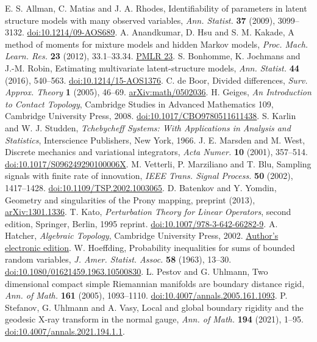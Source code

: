 E. S. Allman, C. Matias and J. A. Rhodes,
Identifiability of parameters in latent structure models with many observed variables,
\emph{Ann. Statist.} \textbf{37} (2009), 3099--3132.
\href{https://doi.org/10.1214/09-AOS689}{doi:10.1214/09-AOS689}.
A. Anandkumar, D. Hsu and S. M. Kakade,
A method of moments for mixture models and hidden Markov models,
\emph{Proc. Mach. Learn. Res.} \textbf{23} (2012), 33.1--33.34.
\href{https://proceedings.mlr.press/v23/anandkumar12.html}{PMLR 23}.
S. Bonhomme, K. Jochmans and J.-M. Robin,
Estimating multivariate latent-structure models,
\emph{Ann. Statist.} \textbf{44} (2016), 540--563.
\href{https://doi.org/10.1214/15-AOS1376}{doi:10.1214/15-AOS1376}.
C. de Boor, Divided differences,
\emph{Surv. Approx. Theory} \textbf{1} (2005), 46--69.
\href{https://arxiv.org/abs/math/0502036}{arXiv:math/0502036}.
H. Geiges, \emph{An Introduction to Contact Topology},
Cambridge Studies in Advanced Mathematics 109, Cambridge University Press, 2008.
\href{https://doi.org/10.1017/CBO9780511611438}{doi:10.1017/CBO9780511611438}.
S. Karlin and W. J. Studden,
\emph{Tchebycheff Systems: With Applications in Analysis and Statistics},
Interscience Publishers, New York, 1966.
J. E. Marsden and M. West,
Discrete mechanics and variational integrators,
\emph{Acta Numer.} \textbf{10} (2001), 357--514.
\href{https://doi.org/10.1017/S096249290100006X}{doi:10.1017/S096249290100006X}.
M. Vetterli, P. Marziliano and T. Blu,
Sampling signals with finite rate of innovation,
\emph{IEEE Trans. Signal Process.} \textbf{50} (2002), 1417--1428.
\href{https://doi.org/10.1109/TSP.2002.1003065}{doi:10.1109/TSP.2002.1003065}.
D. Batenkov and Y. Yomdin,
Geometry and singularities of the Prony mapping,
preprint (2013), \href{https://arxiv.org/abs/1301.1336}{arXiv:1301.1336}.
T. Kato, \emph{Perturbation Theory for Linear Operators},
second edition, Springer, Berlin, 1995 reprint.
\href{https://doi.org/10.1007/978-3-642-66282-9}{doi:10.1007/978-3-642-66282-9}.
A. Hatcher, \emph{Algebraic Topology}, Cambridge University Press, 2002.
\href{https://pi.math.cornell.edu/~hatcher/AT/ATpage.html}{Author's electronic edition}.
W. Hoeffding, Probability inequalities for sums of bounded random variables,
\emph{J. Amer. Statist. Assoc.} \textbf{58} (1963), 13--30.
\href{https://doi.org/10.1080/01621459.1963.10500830}{doi:10.1080/01621459.1963.10500830}.
L. Pestov and G. Uhlmann,
Two dimensional compact simple Riemannian manifolds are boundary distance rigid,
\emph{Ann. of Math.} \textbf{161} (2005), 1093--1110.
\href{https://doi.org/10.4007/annals.2005.161.1093}{doi:10.4007/annals.2005.161.1093}.
P. Stefanov, G. Uhlmann and A. Vasy,
Local and global boundary rigidity and the geodesic X-ray transform in the normal gauge,
\emph{Ann. of Math.} \textbf{194} (2021), 1--95.
\href{https://doi.org/10.4007/annals.2021.194.1.1}{doi:10.4007/annals.2021.194.1.1}.
